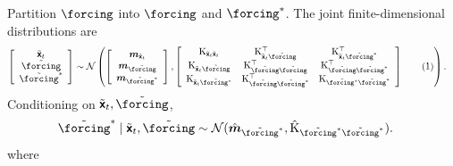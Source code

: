 \documentclass{article}
\newcommand\numberthis{\addtocounter{equation}{1}\tag{\theequation}}
\newcommand{\vv}[1]{\boldsymbol{#1}}
\newcommand{\mm}[1]{\mathrm{#1}}
\newcommand{\rv}[1]{\mathsf{#1}}
\newcommand{\dist}[1]{\mathcal{#1}}
\newcommand{\gvn}{\mid}
\newcommand{\state}{\rv{x}}
\begin{document}
Partition \(\forcing\) into \(\forcing\) and \(\forcing^{*}\).
The joint finite-dimensional distributions are
\begin{align*}
\left[\begin{array}{c}
    \tilde{\vv{\state}}_{t} \\
    \tilde{\forcing}\\
    \tilde{\forcing}^{*}
\end{array}\right]
&\sim\dist{N}\left(
    \left[\begin{array}{c}
        \vv{m}_{\tilde{\vv{\state}}_{t}}\\
        \vv{m}_{\tilde{\forcing}}\\
        \vv{m}_{\tilde{\forcing}^{*}}
    \end{array}\right],
    \left[\begin{array}{ccc}
        \mm{K}_{\tilde{\vv{\state}}_{t}\tilde{\vv{\state}}_{t}}
        & \mm{K}_{\tilde{\vv{\state}}_{t}\tilde{\forcing}}^{\top} 
        & \mm{K}_{\tilde{\vv{\state}}_{t}\tilde{\forcing}^{*}}^{\top} \\ 
          \mm{K}_{\tilde{\vv{\state}}_{t}\tilde{\forcing}}
        & \mm{K}_{\tilde{\forcing}\tilde{\forcing}}^{\top}
        & \mm{K}_{\tilde{\forcing}\tilde{\forcing}^{*}}^{\top} \\
          \mm{K}_{\tilde{\vv{\state}}_{t}\tilde{\forcing^{*}}}
        & \mm{K}_{\tilde{\forcing}\tilde{\forcing}^{*}}^{\top}
        & \mm{K}_{\tilde{\forcing^{*}}\tilde{\forcing}^{*}} \\
    \end{array}\right]\numberthis\label{eq:discrete_joint_naive_sub}
\right).
\end{align*}
Conditioning on \(\tilde{\vv{\state}}_{t},\tilde{\forcing}\), 
\begin{align*}
    \tilde{\forcing}^{*}\gvn  \tilde{\vv{\state}}_{t},\tilde{\forcing}
&\sim\dist{N}(
    \hat{\vv{m}}_{\tilde{\forcing}^{*}},
    \hat{\mm{K}}_{\tilde{\forcing}^{*}\tilde{\forcing}^{*}}
).
\end{align*}
where
\end{document}
